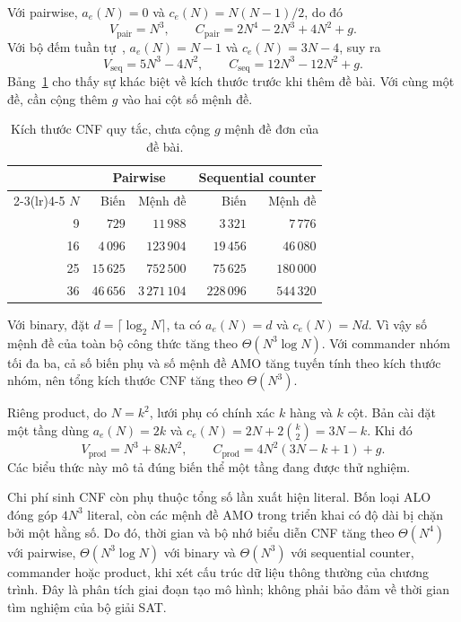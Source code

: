 \documentclass[a4paper,fleqn]{cas-sc}
\begin{document}
Với pairwise, $a_e(N)=0$ và $c_e(N)=N(N-1)/2$, do đó
\begin{equation}
 V_{\mathrm{pair}}=N^3,\qquad
 C_{\mathrm{pair}}=2N^4-2N^3+4N^2+g.
 \label{eq:method-pair-count}
\end{equation}
Với bộ đếm tuần tự~, $a_e(N)=N-1$ và $c_e(N)=3N-4$,
suy ra
\begin{equation}
 V_{\mathrm{seq}}=5N^3-4N^2,\qquad
 C_{\mathrm{seq}}=12N^3-12N^2+g.
 \label{eq:method-seq-count}
\end{equation}
Bảng~\ref{tab:method-cnf-growth} cho thấy sự khác biệt về kích thước
trước khi thêm đề bài. Với cùng một đề, cần cộng thêm $g$ vào hai cột
số mệnh đề.

\begin{table}[pos=htbp]
 \centering
 \caption{Kích thước CNF quy tắc, chưa cộng $g$ mệnh đề đơn của đề bài.}
 \label{tab:method-cnf-growth}
 \begin{tabular}{rrrrr}
  \toprule
  & \multicolumn{2}{c}{Pairwise} & \multicolumn{2}{c}{Sequential counter} \\
  \cmidrule(lr){2-3}\cmidrule(lr){4-5}
  $N$ & Biến & Mệnh đề & Biến & Mệnh đề \\
  \midrule
  9  & $729$ & $11\,988$ & $3\,321$ & $7\,776$ \\
  16 & $4\,096$ & $123\,904$ & $19\,456$ & $46\,080$ \\
  25 & $15\,625$ & $752\,500$ & $75\,625$ & $180\,000$ \\
  36 & $46\,656$ & $3\,271\,104$ & $228\,096$ & $544\,320$ \\
  \bottomrule
 \end{tabular}
\end{table}

Với binary, đặt $d=\lceil\log_2N\rceil$, ta có $a_e(N)=d$ và
$c_e(N)=Nd$. Vì vậy số mệnh đề của toàn bộ công thức tăng theo
$\Theta(N^3\log N)$. Với commander nhóm tối đa ba, cả số biến phụ và
số mệnh đề AMO tăng tuyến tính theo kích thước nhóm, nên tổng kích thước
CNF tăng theo $\Theta(N^3)$.

Riêng product, do $N=k^2$, lưới phụ có chính xác $k$ hàng và $k$ cột.
Bản cài đặt một tầng dùng $a_e(N)=2k$ và
$c_e(N)=2N+2\binom{k}{2}=3N-k$. Khi đó
\begin{equation}
 V_{\mathrm{prod}}=N^3+8kN^2,\qquad
 C_{\mathrm{prod}}=4N^2(3N-k+1)+g.
 \label{eq:method-product-count}
\end{equation}
Các biểu thức này mô tả đúng biến thể một tầng đang được thử nghiệm.

Chi phí sinh CNF còn phụ thuộc tổng số lần xuất hiện literal. Bốn loại
ALO đóng góp $4N^3$ literal, còn các mệnh đề AMO trong triển khai có
độ dài bị chặn bởi một hằng số. Do đó, thời gian và bộ nhớ biểu diễn
CNF tăng theo $\Theta(N^4)$ với pairwise,
$\Theta(N^3\log N)$ với binary và $\Theta(N^3)$ với sequential counter,
commander hoặc product, khi xét cấu trúc dữ liệu thông thường của
chương trình. Đây là phân tích giai đoạn tạo mô hình; không phải bảo
đảm về thời gian tìm nghiệm của bộ giải SAT.
\end{document}
